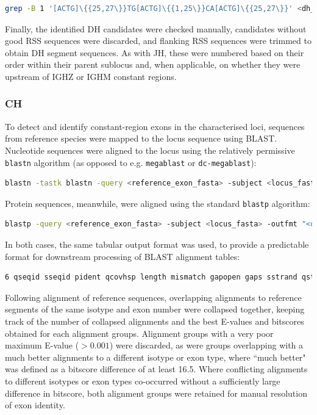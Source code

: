 \begin{lstlisting}[language=bash]
grep -B 1 '[ACTG]\{{25,27\}}TG[ACTG]\{{1,25\}}CA[ACTG]\{{25,27\}}' <dh_fasta> | sed '/^--$'/d > <output_fasta>
\end{lstlisting}

Finally, the identified DH candidates were checked manually, candidates without good RSS sequences were discarded, and flanking RSS sequences were trimmed to obtain DH segment sequences. As with JH, these were numbered based on their order within their parent sublocus and, when applicable, on whether they were upstream of IGHZ or IGHM constant regions.

\subsubsection{CH}

To detect and identify constant-region exons in the characterised loci, sequences from reference species were mapped to the locus sequence using BLAST. Nucleotide sequences were aligned to the locus using the relatively permissive \lstinline{blastn} algorithm (as opposed to e.g. \lstinline{megablast} or \lstinline{dc-megablast}):

\begin{lstlisting}[language=bash]
blastn -tastk blastn -query <reference_exon_fasta> -subject <locus_fasta> -outfmt "<output_format>"
\end{lstlisting}

Protein sequences, meanwhile, were aligned using the standard \lstinline[columns=fixed]{blastp} algorithm:

\begin{lstlisting}[language=bash]
blastp -query <reference_exon_fasta> -subject <locus_fasta> -outfmt "<output_format>"
\end{lstlisting}

In both cases, the same tabular output format was used, to provide a predictable format for downstream processing of BLAST alignment tables:

\begin{lstlisting}[language=bash]
6 qseqid sseqid pident qcovhsp length mismatch gapopen gaps sstrand qstart qend sstart send evalue bitscore qlen slen
\end{lstlisting}

Following alignment of reference sequences, overlapping alignments to reference segments of the same isotype and exon number were collapsed together, keeping track of the number of collapsed alignments and the best E-values and bitscores obtained for each alignment groups. Alignment groups with a very poor maximum E-value ($> 0.001$) were discarded, as were groups overlapping with a much better alignments to a different isotype or exon type, where ``much better" was defined as a bitscore difference of at least 16.5. Where conflicting alignments to different isotypes or exon types co-occurred without a sufficiently large difference in bitscore, both alignment groups were retained for manual resolution of exon identity.

